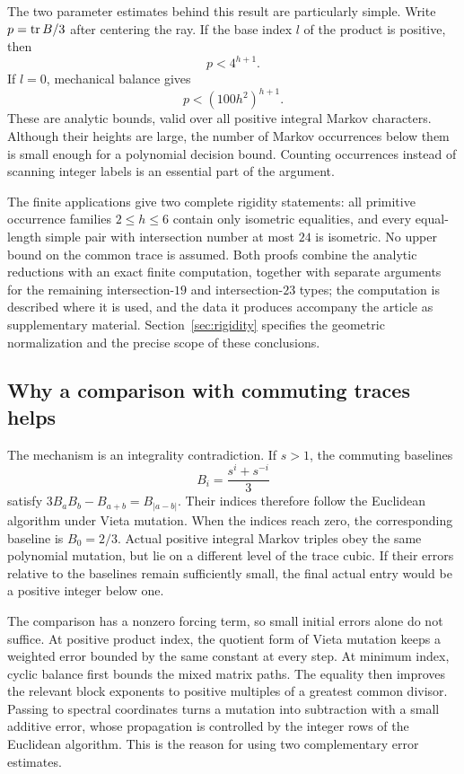 The two parameter estimates behind this result are particularly simple.
Write $p=\operatorname{tr} B/3$ after centering the ray. If the base index $l$ of
the product is positive, then
$$
 p<4^{h+1}.
$$
If $l=0$, mechanical balance gives
$$
 p<(100h^2)^{h+1}.
$$
These are analytic bounds, valid over all positive integral Markov
characters. Although their heights
are large, the number of Markov occurrences below them is small enough
for a polynomial decision bound. Counting occurrences instead of scanning
integer labels is an essential part of the argument.

The finite applications give two complete rigidity statements:
all primitive occurrence families $2\leqslant h\leqslant6$ contain
only isometric equalities, and every equal-length simple pair with
intersection number at most $24$ is isometric. No upper bound on the common trace is assumed. Both proofs combine the analytic
reductions with an exact finite computation, together with separate
arguments for the remaining intersection-$19$ and intersection-$23$
types; the computation is
described where it is used, and the data it produces accompany the
article as supplementary material. Section~\ref{sec:rigidity} specifies the geometric normalization
and the precise scope of these conclusions.

\subsection{Why a comparison with commuting traces helps}

The mechanism is an integrality contradiction. If $s>1$, the commuting
baselines
$$
 B_i=\frac{s^i+s^{-i}}3
$$
satisfy $3B_aB_b-B_{a+b}=B_{|a-b|}$. Their indices therefore follow
the Euclidean algorithm under Vieta mutation. When the indices reach
zero, the corresponding baseline is $B_0=2/3$.
Actual positive integral Markov triples obey the same polynomial
mutation, but lie on a different level of the trace cubic. If their
errors relative to the baselines remain sufficiently small, the final
actual entry would be a positive integer below one.

The comparison has a nonzero forcing term, so small initial errors
alone do not suffice. At positive product index, the quotient form of
Vieta mutation keeps a weighted error bounded by the same constant at
every step. At minimum index, cyclic balance first bounds the mixed
matrix paths. The equality then improves the relevant block exponents
to positive multiples of a greatest common divisor. Passing to spectral
coordinates turns a mutation into subtraction with a small additive
error, whose propagation is controlled by the integer rows of the
Euclidean algorithm. This is the reason for using two complementary
error estimates.

